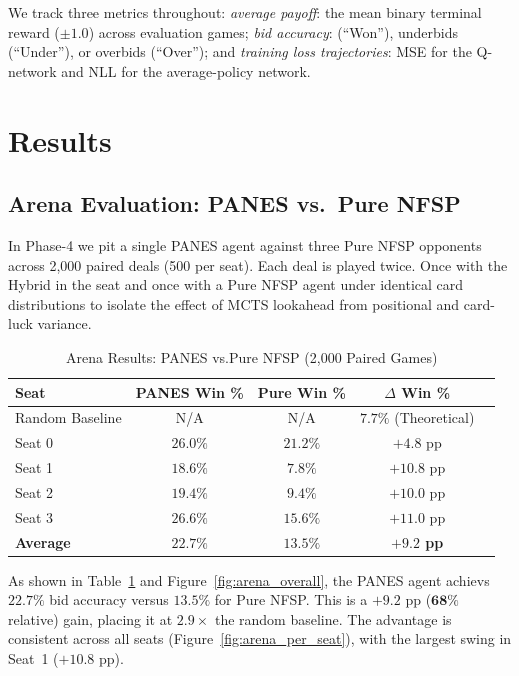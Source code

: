 \documentclass[conference]{IEEEtran}
\begin{document}
We track three metrics throughout: \textit{average payoff}: the mean binary terminal reward ($\pm1.0$) across evaluation games; \textit{bid accuracy}: (``Won''), underbids (``Under''), or overbids (``Over''); and \textit{training loss trajectories}: MSE for the Q-network and NLL for the average-policy network.
 

\section{\large \textbf{Results}}

\subsection{\textbf{Arena Evaluation: PANES vs.\ Pure NFSP}}
\label{sec:arena}
In Phase-4 we pit a single PANES agent against three Pure NFSP opponents across 2{,}000 paired deals (500 per seat). Each deal is played twice. Once with the Hybrid in the seat and once with a Pure NFSP agent under identical card distributions to isolate the effect of MCTS lookahead from positional and card-luck variance.

\begin{table}[!t]
\centering
\caption{\normalsize Arena Results: PANES vs.\@ Pure NFSP (2{,}000 Paired Games)}
\label{tab:arena}
\normalsize
\renewcommand{\arraystretch}{1.2}
\setlength{\tabcolsep}{12pt}
\begin{tabular}{@{}lcccc@{}}
\toprule
\textbf{Seat} & \textbf{PANES Win \%} & \textbf{Pure Win \%} & \textbf{$\Delta$ Win \%} \\
\midrule
Random Baseline & N/A & N/A & $7.7\%$ (Theoretical) \\
\midrule
Seat 0 & $26.0\%$ & $21.2\%$ & $+4.8$ pp \\
Seat 1 & $18.6\%$ & $7.8\%$  & $+10.8$ pp \\
Seat 2 & $19.4\%$ & $9.4\%$  & $+10.0$ pp \\
Seat 3 & $26.6\%$ & $15.6\%$ & $+11.0$ pp \\
\midrule
\textbf{Average} & \textbf{$22.7\%$} & \textbf{$13.5\%$} & \textbf{$+9.2$ pp} \\
\bottomrule
\end{tabular}
\end{table}

As shown in Table~\ref{tab:arena} and Figure~\ref{fig:arena_overall}, the PANES agent achievs $22.7\%$ bid accuracy versus $13.5\%$ for Pure NFSP. This is a $+9.2$ pp ($\mathbf{68\%}$ relative) gain, placing it at $2.9\times$ the random baseline. The advantage is consistent across all seats (Figure~\ref{fig:arena_per_seat}), with the largest swing in Seat~1 ($+10.8$ pp).
\end{document}
